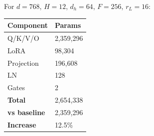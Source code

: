 For $d = 768$, $H = 12$, $d_h = 64$, $F = 256$, $r_L = 16$:

\begin{table}[H]
\centering
\small
\begin{tabular}{ll}
\toprule
\textbf{Component} & \textbf{Params} \\
\midrule
Q/K/V/O & 2,359,296 \\
LoRA & 98,304 \\
Projection & 196,608 \\
LN & 128 \\
Gates & 2 \\
\textbf{Total} & 2,654,338 \\
\textbf{vs baseline} & 2,359,296 \\
\textbf{Increase} & 12.5\% \\
\bottomrule
\end{tabular}
\end{table}

